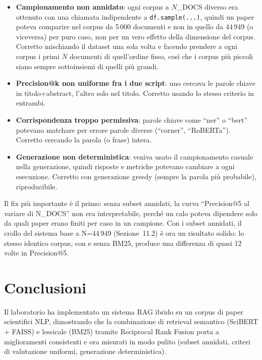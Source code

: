 \documentclass[12pt,a4paper]{article}
\begin{document}
\begin{itemize}
  \item \textbf{Campionamento non annidato}: ogni corpus a $N$\_DOCS diverso era ottenuto con una chiamata indipendente a \texttt{df.sample(...)}, quindi un paper poteva comparire nel corpus da 5\,000 documenti e non in quello da 44\,949 (o viceversa) per puro caso, non per un vero effetto della dimensione del corpus. Corretto mischiando il dataset una sola volta e facendo prendere a ogni corpus i primi $N$ documenti di quell'ordine fisso, cos\`i che i corpus pi\`u piccoli siano sempre sottoinsiemi di quelli pi\`u grandi.
  \item \textbf{Precision@k non uniforme fra i due script}: uno cercava le parole chiave in titolo+abstract, l'altro solo nel titolo. Corretto usando lo stesso criterio in entrambi.
  \item \textbf{Corrispondenza troppo permissiva}: parole chiave come ``ner'' o ``bert'' potevano matchare per errore parole diverse (``corner'', ``RoBERTa''). Corretto cercando la parola (o frase) intera.
  \item \textbf{Generazione non deterministica}: veniva usato il campionamento casuale nella generazione, quindi risposte e metriche potevano cambiare a ogni esecuzione. Corretto con generazione greedy (sempre la parola pi\`u probabile), riproducibile.
\end{itemize}

Il fix pi\`u importante \`e il primo: senza subset annidati, la curva ``Precision@5 al variare di N\_DOCS'' non era interpretabile, perch\'e un calo poteva dipendere solo da quali paper erano finiti per caso in un campione. Con i subset annidati, il crollo del sistema base a N=44\,949 (Sezione~11.2) \`e ora un risultato solido: lo stesso identico corpus, con e senza BM25, produce una differenza di quasi 12 volte in Precision@5.

\section{Conclusioni}

Il laboratorio ha implementato un sistema RAG ibrido su un corpus di paper scientifici NLP, dimostrando che la combinazione di retrieval semantico (SciBERT + FAISS) e lessicale (BM25) tramite Reciprocal Rank Fusion porta a miglioramenti consistenti e ora misurati in modo pulito (subset annidati, criteri di valutazione uniformi, generazione deterministica).
\end{document}
